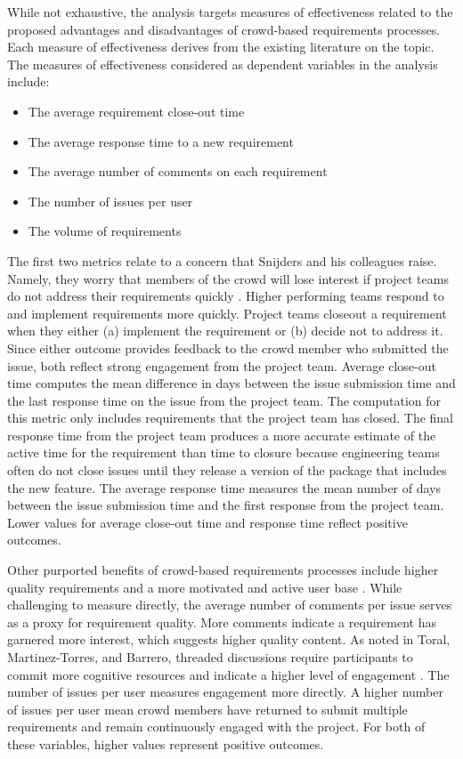 While not exhaustive, the analysis targets measures of effectiveness related to the proposed advantages and disadvantages of crowd-based requirements processes. Each measure of effectiveness derives from the existing literature on the topic. The measures of effectiveness considered as dependent variables in the analysis include:

\begin{itemize}
    \item The average requirement close-out time
    \item The average response time to a new requirement
    \item The average number of comments on each requirement
    \item The number of issues per user
    \item The volume of requirements
\end{itemize}

The first two metrics relate to a concern that Snijders and his colleagues raise. Namely, they worry that members of the crowd will lose interest if project teams do not address their requirements quickly \cite{snijders, snijders2}. Higher performing teams respond to and implement requirements more quickly. Project teams closeout a requirement when they either (a) implement the requirement or (b) decide not to address it. Since either outcome provides feedback to the crowd member who submitted the issue, both reflect strong engagement from the project team. Average close-out time computes the mean difference in days between the issue submission time and the last response time on the issue from the project team. The computation for this metric only includes requirements that the project team has closed. The final response time from the project team produces a more accurate estimate of the active time for the requirement than time to closure because engineering teams often do not close issues until they release a version of the package that includes the new feature. The average response time measures the mean number of days between the issue submission time and the first response from the project team. Lower values for average close-out time and response time reflect positive outcomes.

Other purported benefits of crowd-based requirements processes include higher quality requirements \cite{hosseini} and a more motivated and active user base \cite{groen}. While challenging to measure directly, the average number of comments per issue serves as a proxy for requirement quality. More comments indicate a requirement has garnered more interest, which suggests higher quality content. As noted in Toral, Martinez-Torres, and Barrero, threaded discussions require participants to commit more cognitive resources and indicate a higher level of engagement \cite{toral}. The number of issues per user measures engagement more directly. A higher number of issues per user mean crowd members have returned to submit multiple requirements and remain continuously engaged with the project. For both of these variables, higher values represent positive outcomes.

